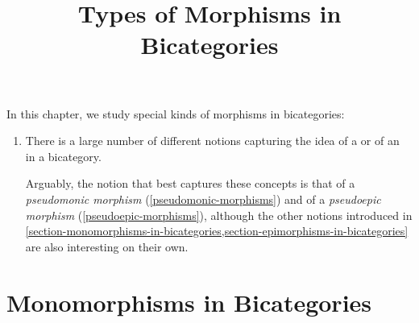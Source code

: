 

%



\title{Types of Morphisms in Bicategories}

\maketitle

\label{section-phantom}

In this chapter, we study special kinds of morphisms in bicategories:
\begin{enumerate}
    \item{}There is a large number of different notions capturing the idea of a  or of an  in a bicategory.

        Arguably, the notion that best captures these concepts is that of a \emph{pseudomonic morphism} (\cref{pseudomonic-morphisms}) and of a \emph{pseudoepic morphism} (\cref{pseudoepic-morphisms}), although the other notions introduced in \cref{section-monomorphisms-in-bicategories,section-epimorphisms-in-bicategories} are also interesting on their own.
\end{enumerate}

\ChapterTableOfContents

\section{Monomorphisms in Bicategories}\label{section-monomorphisms-in-bicategories}
